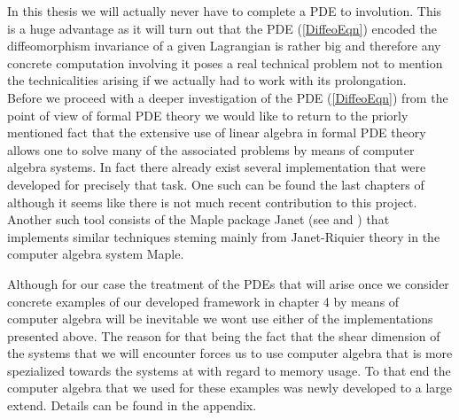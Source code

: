 \documentclass[a4paper,12pt, DIV=14, BCOR=5mm, twoside, headsepline]{scrbook}
\begin{document}
In this thesis we will actually never have to complete a PDE to involution. This is a huge advantage as it will turn out that the PDE (\ref{DiffeoEqn}) encoded the diffeomorphism invariance of a given Lagrangian is rather big and therefore any concrete computation involving it poses a real technical problem not to mention the technicalities arising if we actually had to work with its prolongation. \\

Before we proceed with a deeper investigation of the PDE (\ref{DiffeoEqn}) from the point of view of formal PDE theory we would like to return to the priorly mentioned fact that the extensive use of linear algebra in formal PDE theory allows one to solve many of the associated problems by means of computer algebra systems. In fact there already exist several implementation that were developed for precisely that task. One such can be found the last chapters of \cite{seiler1994analysis} although it seems like there is not much recent contribution to this project. Another such tool consists of the Maple package Janet (see \cite{Janet2} and \cite{Janet}) that implements similar techniques steming mainly from Janet-Riquier theory in the computer algebra system Maple. 

Although for our case the treatment of the PDEs that will arise once we consider concrete examples of our developed framework in chapter 4 by means of computer algebra will be inevitable we wont use either of the implementations presented above. The reason for that being the fact that the shear dimension of the systems that we will encounter forces us to use computer algebra that is more spezialized towards the systems at with regard to memory usage. To that end the computer algebra that we used for these examples was newly developed to a large extend. Details can be found in the appendix.    
\end{document}
